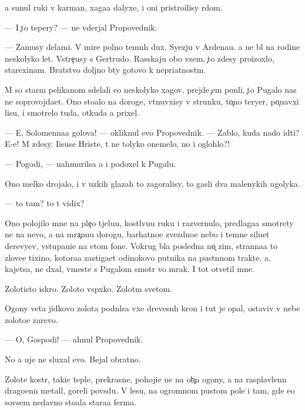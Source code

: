 \documentclass[10pt]{book}
\begin{document}
{\Y}a sunul ruki v karman{\yi}, xaga{\y}a dalyxe, i oni pristro{\y}ilisy r{\ia}dom.

— I {\c}to tepery? — ne v{\yi}derjal Propovednik.

— Za{\y}musy delami. V mire polno temn{\yi}h dux. Syezju v Ardenau. {\Y}a ne b{\yi}l na rodine neskolyko let. Vstre{\c}usy s Gertrudo{\y}. Rasskaju obo vsem, {\c}to zdesy pro{\y}izoxlo, stare{\y}xinam. Bratstvo doljno b{\yi}ty gotovo k nepri{\y}atnost{\ia}m.

M{\yi} so star{\yi}m pelikanom sdelali {\y}e{\x}o neskolyko xagov, prejde {\c}em pon{\ia}li, {\c}to Pugalo nas ne soprovojda{\y}et. Ono sto{\y}alo na doroge, v{\yi}t{\ia}nuvxisy v strunku, to{\c}no teryer, po{\c}u{\y}avxi{\y} lisu, i smotrelo tuda, otkuda {\y}a prixel.

— E{\y}, Solomenna{\y}a golova! — okliknul {\y}evo Propovednik. — Zab{\yi}lo, kuda nado idti? E-e{\y}! M{\yi} zdesy. Iisuse Hriste, t{\yi} ne tolyko onemelo, no i oglohlo?!

— Pogodi, — nahmurilsa {\y}a i podoxel k Pugalu.

Ono melko drojalo, i v uzkih glazah to zagoralisy, to gasli dva malenykih ugolyka.

— {\C}to tam? {\C}to t{\yi} vidix?

Ono polojilo mne na ple{\c}o t{\ia}jelu{\y}u, kostl{\ia}vu{\y}u ruku i razvernulo, predlaga{\y}a smotrety ne na nevo, a na mra{\c}nu{\y}u dorogu, barhatno{\y}e zvezdno{\y}e nebo i temn{\yi}{\y}e siluet{\yi} derevyev, v{\yi}stupa{\y}u{\x}i{\y}e na etom fone. Vokrug b{\yi}la posledn{\ia}{\y}a no{\c} zim{\yi}, stranna{\y}a to{\y} zlove{\x}e{\y} tixino{\y}, kotora{\y}a zastiga{\y}et odinokovo putnika na pust{\yi}nnom trakte. {\Y}a, kajetsa, ne d{\yi}xal, vmeste s Pugalom smotr{\ia} vo mrak. I tot otvetil mne.

Zolotisto{\y} iskro{\y}. Zoloto{\y} vsp{\yi}xko{\y}. Zolot{\yi}m svetom.

Ogony {\q}veta jidkovo zolota podn{\ia}lsa v{\yi}xe drevesn{\yi}h kron i tut je opal, ostaviv v nebe zoloto{\y}e zarevo.

— O, Gospodi! — ahnul Propovednik.

No {\y}a uje ne sluxal {\y}evo. Bejal obratno.



Zolot{\yi}{\y}e kostr{\yi}, taki{\y}e tepl{\yi}{\y}e, prekrasn{\yi}{\y}e, pohoji{\y}e ne na ob{\yi}{\c}n{\yi}{\y} ogony, a na rasplavlenn{\yi}{\y} drago{\q}enn{\yi}{\y} metall, goreli povs{\iu}du. V lesu, na ogromnom pustom pole i tam, gde {\y}e{\x}o sovsem nedavno sto{\y}ala stara{\y}a ferma.
\end{document}

